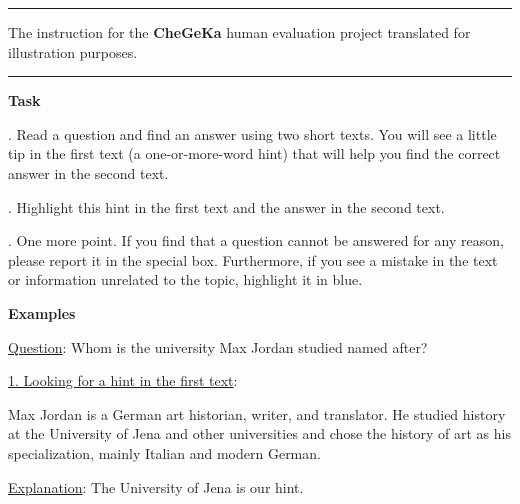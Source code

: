 \documentclass[11pt]{article}
\begin{document}
\begin{table*}[pht!]
\begin{minipage}[t]{.43\linewidth}

\par\noindent\rule{\textwidth}{1pt}

\caption{The instruction for the \textbf{CheGeKa} human evaluation project translated for illustration purposes.}

\label{tab:chegeka}
\end{minipage}\hspace{0.1\textwidth}\begin{minipage}[t]{.43\linewidth}


\par\noindent\rule{\textwidth}{1pt}

\vspace{.5cm}

\textbf{Task}

\vspace{0.05cm}
. Read a question and find an answer using two short texts. You will see a little tip in the first text (a one-or-more-word hint) that will help you find the correct answer in the second text.

. Highlight this hint in the first text and the answer in the second text. 

. One more point. If you find that a question cannot be answered for any reason, please report it in the special box. Furthermore, if you see a mistake in the text or information unrelated to the topic, highlight it in blue.


\vspace{0.2cm}
\textbf{Examples}
\vspace{0.05cm}

\noindent \underline{Question}: Whom is the university Max Jordan studied named after?

\vspace{0.05cm} 
\noindent \underline{1. Looking for a hint in the first text}:
    
Max Jordan is a German art historian, writer, and translator. He studied history at the \colorbox{cb-salmon-pink}{University of Jena} and other universities and chose the history of art as his specialization, mainly Italian and modern German. 

\vspace{0.05cm} 
\noindent \underline{Explanation}: The University of Jena is our hint.


\end{minipage}
\end{table*}
\end{document}
